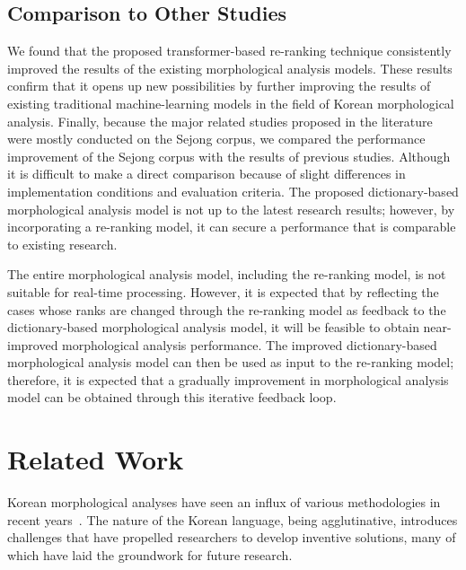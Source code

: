 \documentclass[AMS,STIX2COL]{WileyNJD-v2}
\begin{document}
    \subsection{Comparison to Other Studies}\label{subsec:comparison-to-other-studies}

    We found that the proposed transformer-based re-ranking technique consistently improved the results of the existing morphological analysis models.
    These results confirm that it opens up new possibilities by further improving the results of existing traditional machine-learning models in the field of Korean morphological analysis.
    Finally, because the major related studies proposed in the literature were mostly conducted on the Sejong corpus, we compared the performance improvement of the Sejong corpus with the results of previous studies.
    Although it is difficult to make a direct comparison because of slight differences in implementation conditions and evaluation criteria.
    The proposed dictionary-based morphological analysis model is not up to the latest research results; however, by incorporating a re-ranking model, it can secure a performance that is comparable to existing research.

    The entire morphological analysis model, including the re-ranking model, is not suitable for real-time processing.
    However, it is expected that by reflecting the cases whose ranks are changed through the re-ranking model as feedback to the dictionary-based morphological analysis model, it will be feasible to obtain near-improved morphological analysis performance.
    The improved dictionary-based morphological analysis model can then be used as input to the re-ranking model; therefore, it is expected that a gradually improvement in morphological analysis model can be obtained through this iterative feedback loop.


    \section{Related Work}\label{sec:related-work}

    Korean morphological analyses have seen an influx of various methodologies in recent years~\cite{KwonHC1991, LeeDG2009, ShimKS2011, LeeJS2011, ShinJC2012, LeeCK2013, NaSH2014, NaSH2015, HwangHS2016, KimHM2016, ChungES2016, LeeCH2016, Li2017, NaSH2018, KimSW2018, ChoiYS2018, MinJW2018, MinJW2019, KimHM2019, SongHJ2019, MinJW2020, SongHJ2020, ChoiYS2020, HwangHS2020, KimHJ2021, YounJY2021, MinJW2022, KimJM2022, ShinHJ2023}.
    The nature of the Korean language, being agglutinative, introduces challenges that have propelled researchers to develop inventive solutions, many of which have laid the groundwork for future research.
\end{document}

